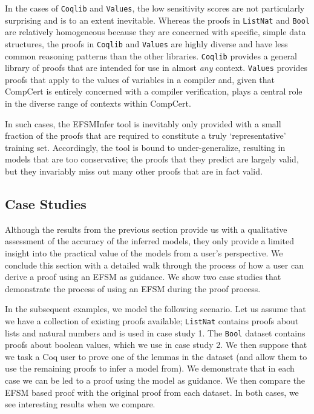 \documentclass{llncs}
\begin{document}
In the cases of \texttt{Coqlib} and \texttt{Values}, the low sensitivity scores are not particularly surprising and is to an extent inevitable. Whereas the proofs in \texttt{ListNat} and \texttt{Bool} are relatively homogeneous because they are concerned with specific, simple data structures, the proofs in \texttt{Coqlib} and \texttt{Values} are highly diverse and have less common reasoning patterns than the other libraries. \texttt{Coqlib} provides a general library of proofs that are intended for use in almost \emph{any} context. \texttt{Values} provides proofs that apply to the values of variables in a compiler and, given that CompCert is entirely concerned with a compiler verification, plays a central role in the diverse range of contexts within CompCert.

In such cases, the EFSMInfer tool is inevitably only provided with a small fraction of the proofs that are required to constitute a truly `representative' training set. Accordingly, the tool is bound to under-generalize, resulting in models that are too conservative; the proofs that they predict are largely valid, but they invariably miss out many other proofs that are in fact valid.

\subsection{Case Studies}
Although the results from the previous section provide us with a qualitative assessment of the accuracy of the inferred models, they only provide a limited insight into the practical value of the models from a user's perspective. We conclude this section with a detailed walk through the process of how a user can derive a proof using an EFSM as guidance. We show two case studies that demonstrate the process of using an EFSM during the proof process.

In the subsequent examples, we model the following scenario. Let us assume that we have a collection of existing proofs available; \texttt{ListNat} contains proofs about lists and natural numbers and is used in case study 1. The \texttt{Bool} dataset contains proofs about boolean values, which we use in case study 2. We then suppose that we task a Coq user to prove one of the lemmas in the dataset (and allow them to use the remaining proofs to infer a model from). We demonstrate that in each case we can be led to a proof using the model as guidance. We then compare the EFSM based proof with the original proof from each dataset. In both cases, we see interesting results when we compare.
\end{document}
